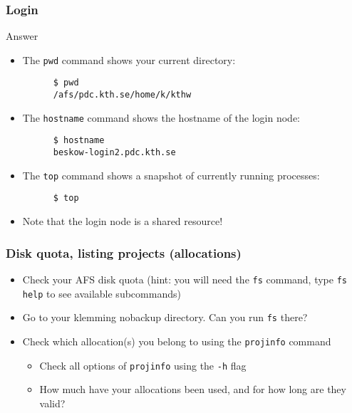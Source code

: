 \begin{frame}[fragile]
  \frametitle{Login}
\begin{exampleblock}{{Answer}}
    \verbatimfont{\footnotesize}
    \begin{itemize}
    \item The \verb|pwd| command shows your current directory:
    \begin{verbatim}
      $ pwd
      /afs/pdc.kth.se/home/k/kthw
    \end{verbatim}

    \item The \verb|hostname| command shows the hostname of the login node:
    \begin{verbatim}
      $ hostname
      beskow-login2.pdc.kth.se
    \end{verbatim}

    \item The \verb|top| command shows a snapshot of currently running processes:
    \begin{verbatim}
      $ top
    \end{verbatim}

    \item Note that the login node is a shared resource!
    \end{itemize}

\end{exampleblock}
\end{frame}


\begin{frame}[fragile]
  \frametitle{Disk quota, listing projects (allocations)}
\begin{itemize}
  \item Check your AFS disk quota (hint: you will need the \verb|fs| command, type \verb|fs help| to see available subcommands)
  \item Go to your klemming nobackup directory. Can you run \verb|fs| there?
  \item Check which allocation(s) you belong to using the \verb|projinfo| command
    \begin{itemize}
      \item Check all options of \verb|projinfo| using the \verb|-h| flag
      \item How much have your allocations been used, and for how long are they valid?
    \end{itemize}
\end{itemize}
\end{frame}


